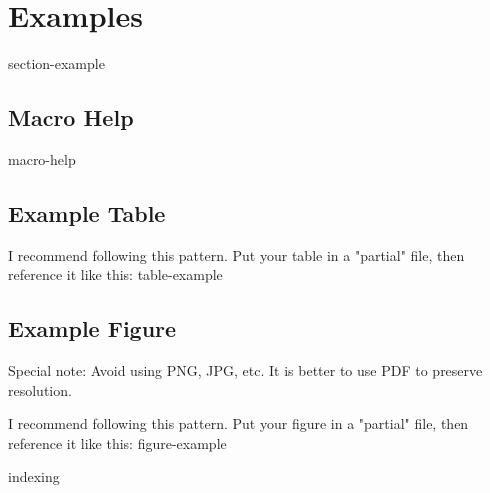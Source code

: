 \chapter{Examples}

{section-example}

\section{Macro Help}
{macro-help}


\section{Example Table}
I recommend following this pattern. Put your table in a "partial" file, then reference it like this:
{table-example}


\section{Example Figure}
Special note: Avoid using PNG, JPG, etc. It is better to use PDF to preserve resolution.

I recommend following this pattern. Put your figure in a "partial" file, then reference it like this:
{figure-example}



{indexing}


